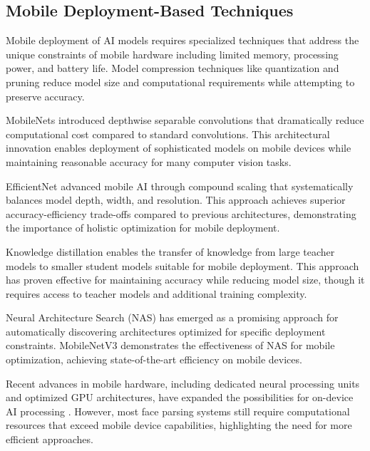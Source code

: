 \documentclass[12pt,a4paper]{report}
\begin{document}
\subsection{Mobile Deployment-Based Techniques}

Mobile deployment of AI models requires specialized techniques that address the unique constraints of mobile hardware including limited memory, processing power, and battery life. Model compression techniques like quantization \cite{jacob2018quantization} and pruning \cite{louizos2018learning} reduce model size and computational requirements while attempting to preserve accuracy.

MobileNets \cite{howard2017mobilenets} introduced depthwise separable convolutions that dramatically reduce computational cost compared to standard convolutions. This architectural innovation enables deployment of sophisticated models on mobile devices while maintaining reasonable accuracy for many computer vision tasks.

EfficientNet \cite{tan2019efficientnet} advanced mobile AI through compound scaling that systematically balances model depth, width, and resolution. This approach achieves superior accuracy-efficiency trade-offs compared to previous architectures, demonstrating the importance of holistic optimization for mobile deployment.

Knowledge distillation \cite{hinton2015distilling} enables the transfer of knowledge from large teacher models to smaller student models suitable for mobile deployment. This approach has proven effective for maintaining accuracy while reducing model size, though it requires access to teacher models and additional training complexity.

Neural Architecture Search (NAS) \cite{zoph2018learning} has emerged as a promising approach for automatically discovering architectures optimized for specific deployment constraints. MobileNetV3 \cite{howard2019searching} demonstrates the effectiveness of NAS for mobile optimization, achieving state-of-the-art efficiency on mobile devices.

Recent advances in mobile hardware, including dedicated neural processing units and optimized GPU architectures, have expanded the possibilities for on-device AI processing \cite{ignatov2018ai}. However, most face parsing systems still require computational resources that exceed mobile device capabilities, highlighting the need for more efficient approaches.
\end{document}
